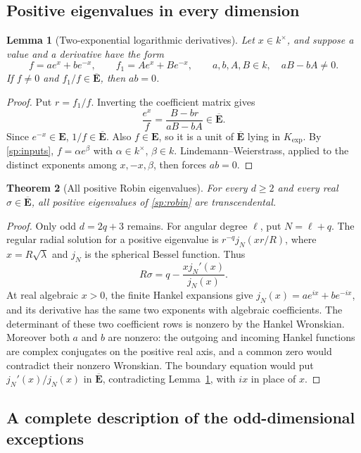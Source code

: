 \documentclass[11pt]{article}
\newtheorem{theorem}{Theorem}[section]
\newtheorem{lemma}[theorem]{Lemma}
\theoremstyle{definition}
\theoremstyle{remark}
\begin{document}
\subsection{Positive eigenvalues in every dimension}

\begin{lemma}[Two-exponential logarithmic derivatives]
\label{sp:twoexp}
Let $x\in k^\times$, and suppose a value and a derivative have the form
\[
 f=a e^x+b e^{-x},\qquad f_1=A e^x+B e^{-x},
 \qquad a,b,A,B\in k,\quad aB-bA\ne0.
\]
If $f\ne0$ and $f_1/f\in\overline{\mathbf E}$, then $ab=0$.
\end{lemma}
\begin{proof}
Put $r=f_1/f$.  Inverting the coefficient matrix gives
\[
 \frac{e^x}{f}=\frac{B-br}{aB-bA}\in\overline{\mathbf E}.
\]
Since $e^{-x}\in\mathbf E$, $1/f\in\overline{\mathbf E}$.
Also $f\in\mathbf E$, so it is a unit of $\overline{\mathbf E}$ lying
in $K_{\exp}$.  By \eqref{sp:inputs}, $f=\alpha e^\beta$ with
$\alpha\in k^\times$, $\beta\in k$.  Lindemann--Weierstrass, applied
to the distinct exponents among $x,-x,\beta$, then forces $ab=0$.
\end{proof}

\begin{theorem}[All positive Robin eigenvalues]\label{sp:positive}
For every $d\ge2$ and every real
$\sigma\in\overline{\mathbf E}$, all positive eigenvalues of
\eqref{sp:robin} are transcendental.
\end{theorem}
\begin{proof}
Only odd $d=2q+3$ remains.  For angular degree $\ell$, put
$N=\ell+q$.  The regular radial solution for a positive eigenvalue is
$r^{-q}j_N(xr/R)$, where $x=R\sqrt\lambda$ and $j_N$ is the spherical
Bessel function.  Thus
\[
 R\sigma=q-\frac{xj_N'(x)}{j_N(x)}.
\]
At real algebraic $x>0$, the finite Hankel expansions give
$j_N(x)=a e^{ix}+b e^{-ix}$, and its derivative has the same two
exponents with algebraic coefficients.  The determinant of these two
coefficient rows is nonzero by the Hankel Wronskian.  Moreover both
$a$ and $b$ are nonzero: the outgoing and incoming Hankel functions are
complex conjugates on the positive real axis, and a common zero would
contradict their nonzero Wronskian.  The boundary equation would put
$j_N'(x)/j_N(x)$ in $\overline{\mathbf E}$, contradicting
Lemma~\ref{sp:twoexp}, with $ix$ in place of $x$.
\end{proof}

\subsection{A complete description of the odd-dimensional exceptions}
\end{document}

